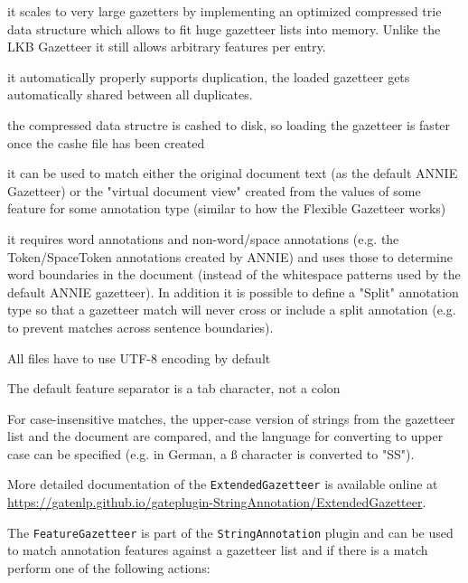 \begin{plist}

\item{} it scales to very large gazetters by implementing an optimized compressed trie data structure
  which allows to fit huge gazetteer lists into memory. Unlike the LKB Gazetteer it still allows
  arbitrary features per entry. 
\item{} it automatically properly supports duplication, the loaded gazetteer gets automatically shared 
  between all duplicates.
\item{} the compressed data structre is cashed to disk, so loading the gazetteer is faster once the 
  cashe file has been created
\item{} it can be used to match either the original document text (as the default ANNIE Gazetteer) or
  the "virtual document view" created from the values of some feature for some annotation type 
  (similar to how the Flexible Gazetteer works)
\item{} it requires word annotations and non-word/space annotations (e.g. the Token/SpaceToken annotations
  created by ANNIE) and uses those to determine word boundaries in the document (instead of the whitespace
  patterns used by the default ANNIE gazetteer). In addition it is possible to define a "Split" annotation 
  type so that a gazetteer match will never cross or include a split annotation (e.g. to prevent matches
  across sentence boundaries).
\item{} All files have to use UTF-8 encoding by default
\item{} The default feature separator is a tab character, not a colon
\item{} For case-insensitive matches, the upper-case version of strings from the gazetteer list and 
  the document are compared, and the language for converting to upper case can be specified 
  (e.g. in German, a {\ss} character is converted to "SS").   

\end{plist}

More detailed documentation of the \texttt{ExtendedGazetteer} is available online at 
\url{https://gatenlp.github.io/gateplugin-StringAnnotation/ExtendedGazetteer}.


The \texttt{FeatureGazetteer} is part of the \texttt{StringAnnotation} plugin and 
can be used to match annotation features against a gazetteer list and if there is a match
perform one of the following actions:

